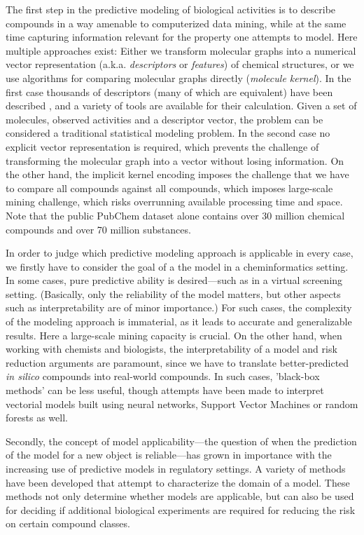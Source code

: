 \documentclass{sig-alternate}
\begin{document}
The first step in the predictive modeling of biological activities is
to describe compounds in a way amenable to computerized data mining, while at the same time capturing information relevant for the property one attempts to model. Here multiple approaches exist: Either we transform molecular graphs into a
numerical vector representation (a.k.a. \emph{descriptors} or
\emph{features}) of chemical structures, or we use algorithms for
comparing molecular graphs directly (\emph{molecule kernel}). In the
first case thousands of descriptors (many of which are equivalent)
have been described \cite{todeschini2000},
and a variety of tools are available for their calculation. Given a
set of molecules, observed activities and a descriptor vector, the
problem can be considered a traditional statistical modeling
problem. In the second case no explicit vector representation is
required, which prevents the challenge of transforming the molecular
graph into a vector without losing information. On the other hand, the
implicit kernel encoding imposes the challenge that we have to compare all compounds against
all compounds, which imposes large-scale mining challenge, which risks overrunning available
processing time and space. Note that the public PubChem dataset alone
contains over 30 million chemical compounds and over 70 million substances.

In order to judge which predictive modeling approach is applicable in every case, we firstly have to consider the goal of a the model in a cheminformatics setting. In some cases, pure predictive ability is
desired---such as in a virtual screening setting. (Basically, only the reliability of the model matters, but other aspects such as interpretability are of minor importance.) For such cases, the
complexity of the modeling approach is immaterial, as it leads to
accurate and generalizable results. Here a large-scale mining capacity
is crucial. On the other hand, when working with chemists and
biologists, the interpretability of a model and risk reduction
arguments are paramount, since we have to translate better-predicted
\emph{in silico} compounds into real-world compounds. In such cases,
'black-box methods' can be less useful, though attempts have been made
to interpret vectorial models built using neural networks, Support Vector Machines or
random forests as well.

Secondly, the concept of model applicability---the question of when the prediction of the model
for a new object is reliable---has grown in importance with
the increasing use of predictive models in regulatory settings. A
variety of methods have been developed that attempt to characterize
the domain of a model. These methods not only determine whether models
are applicable, but can also be used for deciding if additional
biological experiments are required for reducing the risk on certain
compound classes.
\end{document}
